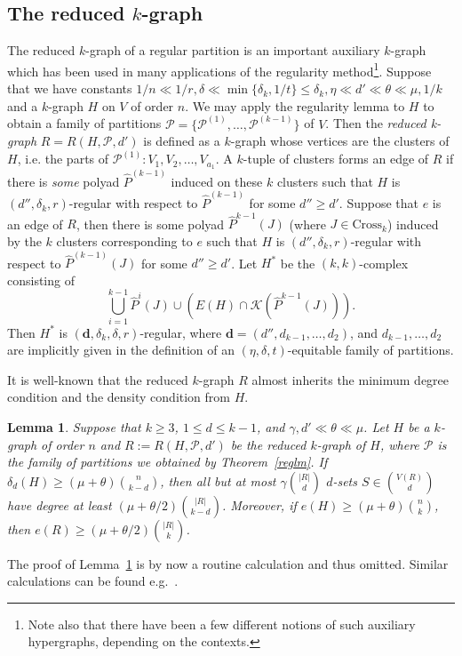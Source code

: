\documentclass[11pt, reqno]{amsart}    	%
\newtheorem{lemma}[thm]{Lemma}
\theoremstyle{definition}
\numberwithin{equation}{section}
\begin{document}
	
	\subsection{The reduced $ k $-graph}
	The reduced $k$-graph of a regular partition is an important auxiliary $k$-graph which has been used in many applications of the regularity method\footnote{Note also that there have been a few different notions of such auxiliary hypergraphs, depending on the contexts.}.
	Suppose that we have constants
	$ 1/n\ll1/r,\delta\ll\min\{\delta_{k},1/t\}\le \delta_{k},\eta\ll d'\ll\theta\ll\mu ,1/k $
	and a $ k $-graph $ H $ on $ V  $ of order $ n $. We may apply the regularity
	lemma to $ H $ to obtain a family of partitions $ \mathcal{P}=\{\mathcal{P}^{(1)},\dots,\mathcal{P}^{(k-1)}\} $ of $ V $. Then the \emph{reduced k-graph} $ R = R(H,\mathcal{P}, d') $ is defined as a $ k $-graph whose vertices are the clusters of $ H $, i.e. the parts of $ \mathcal{P}^{(1)}: V_1,V_2,\dots,V_{a_{1}} $.
	A $k$-tuple of clusters forms an edge of $R$ if there is \emph{some} polyad $ \hat{P}^{(k-1)} $ induced on these $ k $ clusters such that $ H $ is $ (d'',\delta_{k}, r) $-regular with respect to $  \hat{P}^{(k-1)}  $ for some $ d''\ge d' $. Suppose that $ e $ is an edge of $R$, then there is some polyad $ \hat{P}^{k-1}(J) $ (where $ J\in \text{Cross}_{k} $) induced by the $ k $ clusters corresponding to $e$ such that $ H $ is $ (d'',\delta_{k}, r) $-regular with respect to $  \hat{P}^{(k-1)}(J)  $ for some $ d''\ge d' $.  Let $H^{*}$ be the $(k,k)$-complex consisting of
	\[\label{eqcomplex}
	\bigcup\limits_{i=1}^{k-1}\hat{P}^{i}(J) \cup (E(H)\cap \mathcal{K}(\hat{P}^{k-1}(J))). \tag{*} 
	\] 
	Then $H^{*}$ is  $(\mathbf{d},\delta_{k},\delta,r)$-regular, where $ \mathbf{d}=(d'',d_{k-1},\dots,d_2) $, and $d_{k-1},\dots,d_2$ are implicitly given in the definition of an $ (\eta,\delta,t) $-equitable family of partitions.
	
	It is well-known that 
	the reduced $k$-graph $R$ almost inherits the minimum degree condition  and the density condition from $H$.
	\begin{lemma}\label{deg lem}
		Suppose that $k\ge3$,  $1\leq d\leq k-1$, and $\gamma,d'\ll \theta \ll \mu$. Let $H$ be a $k$-graph of order $n$ and $ R:=R(H,\mathcal{P}, d') $ be the reduced $k$-graph  of $ H $, where $ \mathcal{P} $ is the family of partitions we obtained by Theorem~\ref{reglm}. If  $\delta_d(H)\ge (\mu+\theta) \binom{n}{k-d}$,
		then all but at most $\gamma \binom{|R|}{d}$ $d$-sets $S \in \binom{V(R)}{d}$ have degree at least $(\mu+\theta/2) \binom{|R|}{k-d}$. Moreover, if  $e(H)\ge (\mu+\theta)  \binom{n}{k}$, then  $e(R)\ge (\mu+\theta/2)  \binom{|R|}{k}$.
	\end{lemma}
	The proof of Lemma~\ref{deg lem} is by now a routine calculation and thus omitted.
	Similar calculations can be found e.g.~\cite{Daniela2010Hamilton}.
	
\end{document}
